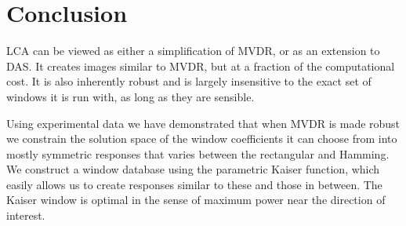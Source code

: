 \documentclass[10pt,journal,draftclsnofoot,onecolumn]{IEEEtran}
\newcommand\Fig[1]{Fig.~\ref{#1}}
\newcommand\1{\vec 1}
\begin{document}
% 
% 


\section{Conclusion}

LCA can be viewed as either a simplification of MVDR, or as an extension to DAS. It creates images similar to MVDR, but at a fraction of the computational cost. It is also inherently robust and is largely insensitive to the exact set of windows it is run with, as long as they are sensible.

Using experimental data we have demonstrated that when MVDR is made robust we constrain the solution space of the window coefficients it can choose from into mostly symmetric responses that varies between the rectangular and Hamming. We construct a window database using the parametric Kaiser function, which easily allows us to create responses similar to these and those in between. The Kaiser window is optimal in the sense of maximum power near the direction of interest.

% 

% 
% 


% 
% 
\end{document}
